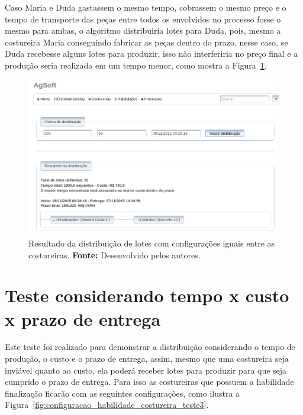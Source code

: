 \par Caso Maria e Duda gastassem o mesmo tempo, cobrassem o mesmo preço e o tempo de
transporte das peças entre todos os envolvidos no processo fosse o mesmo para ambas, 
o algoritmo distribuiria lotes para Duda, pois, mesmo a costureira Maria
conseguindo fabricar as peças dentro do prazo, nesse caso, se Duda recebesse
alguns lotes para produzir, isso não interferiria no preço final e a produção
seria realizada em um tempo menor, como mostra a
Figura~\ref{fig:resultado_tudo_igual}.

\begin{figure}[h!]
	\centerline{\includegraphics[width=14.7cm]{./imagens/resultado_tudo_igual_teste2.png}}
	\caption[Resultado da distribuição de lotes com configurações iguais entre as
	costureiras.] 
	{Resultado da distribuição de lotes com configurações iguais entre as
	costureiras. \textbf{Fonte:}
	Desenvolvido pelos autores.}
	\label{fig:resultado_tudo_igual}
\end{figure}

\section{Teste considerando tempo x custo x prazo de entrega}

\par Este teste foi realizado para demonstrar a distribuição considerando o tempo de
produção, o custo e o prazo de entrega, assim, mesmo que uma costureira seja
inviável quanto ao custo, ela poderá receber lotes para produzir para que seja cumprido o prazo 
de entrega. Para isso as costureiras que possuem a habilidade finalização
ficarão com as seguintes configurações, como ilustra a
Figura~\ref{fig:configuracao_habilidade_costureira_teste3}.

